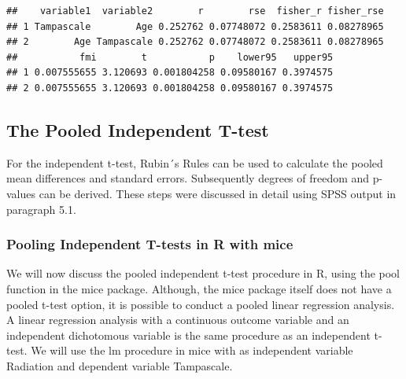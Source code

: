 \documentclass[]{book}
\newenvironment{Shaded}{\begin{snugshade}}{\end{snugshade}}
\newcommand{\CommentTok}[1]{\textcolor[rgb]{0.56,0.35,0.01}{\textit{#1}}}
\theoremstyle{definition}
\theoremstyle{definition}
\theoremstyle{definition}
\theoremstyle{remark}
\begin{document}
\begin{verbatim}
##    variable1  variable2        r        rse  fisher_r fisher_rse
## 1 Tampascale        Age 0.252762 0.07748072 0.2583611 0.08278965
## 2        Age Tampascale 0.252762 0.07748072 0.2583611 0.08278965
##           fmi        t           p    lower95   upper95
## 1 0.007555655 3.120693 0.001804258 0.09580167 0.3974575
## 2 0.007555655 3.120693 0.001804258 0.09580167 0.3974575
\end{verbatim}

\begin{Shaded}
\end{Shaded}

\subsection{The Pooled Independent
T-test}\label{the-pooled-independent-t-test}

For the independent t-test, Rubin´s Rules can be used to calculate the
pooled mean differences and standard errors. Subsequently degrees of
freedom and p-values can be derived. These steps were discussed in
detail using SPSS output in paragraph 5.1.

\subsubsection{Pooling Independent T-tests in R with
mice}\label{pooling-independent-t-tests-in-r-with-mice}

We will now discuss the pooled independent t-test procedure in R, using
the pool function in the mice package. Although, the mice package itself
does not have a pooled t-test option, it is possible to conduct a pooled
linear regression analysis. A linear regression analysis with a
continuous outcome variable and an independent dichotomous variable is
the same procedure as an independent t-test. We will use the lm
procedure in mice with as independent variable Radiation and dependent
variable Tampascale.
\end{document}
